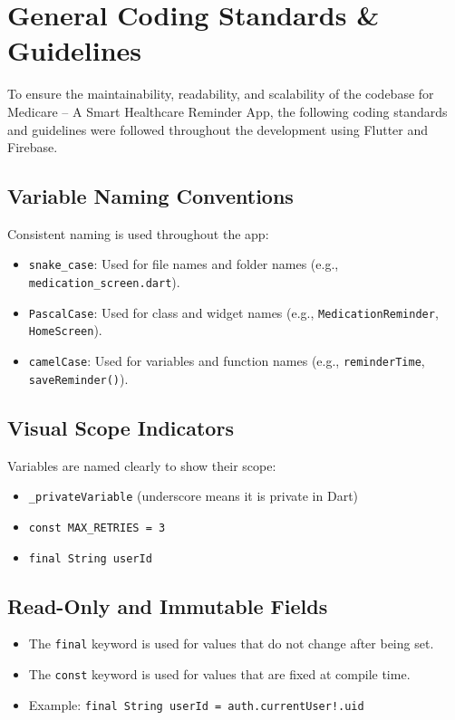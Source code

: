 \appendix
\chapter{General Coding Standards \& Guidelines}
\label{app:coding-standards}

To ensure the maintainability, readability, and scalability of the codebase for Medicare -- A Smart Healthcare Reminder App, the following coding standards and guidelines were followed throughout the development using Flutter and Firebase.

\section{Variable Naming Conventions}
Consistent naming is used throughout the app:
\begin{itemize}
    \item \texttt{snake\_case}: Used for file names and folder names (e.g., \texttt{medication\_screen.dart}).
    \item \texttt{PascalCase}: Used for class and widget names (e.g., \texttt{MedicationReminder}, \texttt{HomeScreen}).
    \item \texttt{camelCase}: Used for variables and function names (e.g., \texttt{reminderTime}, \texttt{saveReminder()}).
\end{itemize}

\section{Visual Scope Indicators}
Variables are named clearly to show their scope:
\begin{itemize}
    \item \texttt{\_privateVariable} (underscore means it is private in Dart)
    \item \texttt{const MAX\_RETRIES = 3}
    \item \texttt{final String userId}
\end{itemize}

\section{Read-Only and Immutable Fields}
\begin{itemize}
    \item The \texttt{final} keyword is used for values that do not change after being set.
    \item The \texttt{const} keyword is used for values that are fixed at compile time.
    \item Example: \texttt{final String userId = auth.currentUser!.uid}
\end{itemize}

